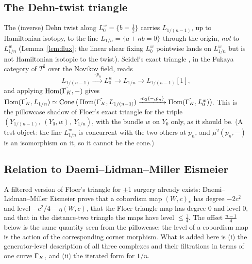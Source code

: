 \subsection{The Dehn-twist triangle}
The (inverse) Dehn twist along $L^w_0=\{b=\tfrac12\}$ carries $L_{1/(n-1)}$, up to Hamiltonian isotopy, to the
line $L_{1/n}=\{a+nb=0\}$ through the origin, \emph{not} to $L^w_{1/n}$ (Lemma~\ref{lem:flux}; the linear shear
fixing $L^w_0$ pointwise lands on $L^w_{1/n}$ but is not Hamiltonian isotopic to the twist).  Seidel's exact
triangle \cite{Seidel}, in the Fukaya category of $T^2$ over the Novikov field, reads
\[
L_{1/(n-1)}\xrightarrow{\ \cdot p_n\ }L^w_0\longrightarrow L_{1/n}\longrightarrow L_{1/(n-1)}[1],
\]
and applying $\operatorname{Hom}(\tilde{\Gamma_K},-)$ gives $\operatorname{Hom}(\tilde{\Gamma_K},L_{1/n})\simeq\operatorname{Cone}\big(\operatorname{Hom}(\tilde{\Gamma_K},L_{1/(n-1)})\xrightarrow{m_2(-,p_n)}\operatorname{Hom}(\tilde{\Gamma_K},L^w_0)\big)$.
This is the pillowcase shadow of Floer's exact triangle for the triple $(Y_{1/(n-1)},\ (Y_0,w),\ Y_{1/n})$, with
the bundle $w$ on $Y_0$ only, as it should be.  (A test object: the line $L^w_{1/n}$ is concurrent with the two
others at $p_n$, and $\mu^2(p_n,-)$ is an isomorphism on it, so it cannot be the cone.)

\subsection{Relation to Daemi--Lidman--Miller Eismeier}
A filtered version of Floer's triangle for $\pm1$ surgery already exists: Daemi--Lidman--Miller Eismeier
\cite{DLM} prove that a cobordism map $(W,c)_*$ has degree $-2c^2$ and level $-c^2/4-\eta(W,c)$, that the Floer
triangle map has degree $0$ and level $0$, and that in the distance-two triangle the maps have level $\le\tfrac14$.
The offset $\tfrac{n-1}{4}$ below is the same quantity seen from the pillowcase: the level of a cobordism map is
the action of the corresponding corner morphism.  What is added here is (i) the generator-level description of
all three complexes and their filtrations in terms of one curve $\Gamma_K$, and (ii) the iterated form for $1/n$.

